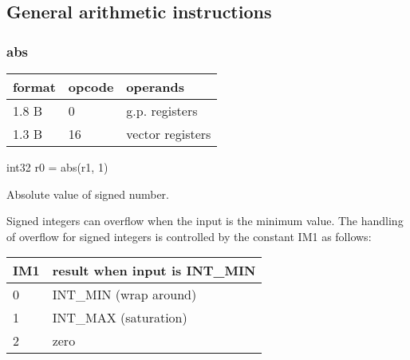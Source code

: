 \documentclass[forwardcom.tex]{subfiles}
\begin{document}
\subsection{General arithmetic instructions}

\subsubsection{abs}
\label{table:absInstruction}
\begin{tabular}{|p{12mm}|p{12mm}|p{110mm}|}
\hline
\bfseries format & \bfseries opcode & \bfseries operands \\ \hline
1.8 B &  0 & g.p. registers \\ \hline
1.3 B & 16 & vector registers \\ \hline
\end{tabular}
\vspace{2mm}

int32 r0 = abs(r1, 1)
\vspace{2mm}


Absolute value of signed number.
\vspace{2mm}

Signed integers can overflow when the input is the minimum value.
The handling of overflow for signed integers is controlled by the constant IM1 as follows:

\begin{longtable}{|p{12mm}|p{80mm}|}
\endfirsthead
\endhead
\hline
\bfseries IM1 & \bfseries result when input is INT\_MIN \\ \hline
0  & INT\_MIN (wrap around) \\ \hline
1  & INT\_MAX (saturation)  \\ \hline
2  & zero                   \\ \hline
\end{longtable}
\vspace{2mm}
\end{document}
